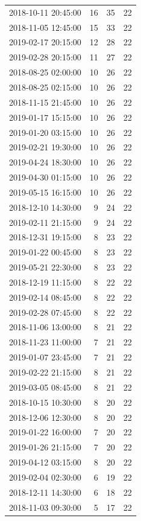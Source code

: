 \begin{tabular}{lrrr}
2018-10-11 20:45:00 & 16 & 35 & 22 \\
2018-11-05 12:45:00 & 15 & 33 & 22 \\
2019-02-17 20:15:00 & 12 & 28 & 22 \\
2019-02-28 20:15:00 & 11 & 27 & 22 \\
2018-08-25 02:00:00 & 10 & 26 & 22 \\
2018-08-25 02:15:00 & 10 & 26 & 22 \\
2018-11-15 21:45:00 & 10 & 26 & 22 \\
2019-01-17 15:15:00 & 10 & 26 & 22 \\
2019-01-20 03:15:00 & 10 & 26 & 22 \\
2019-02-21 19:30:00 & 10 & 26 & 22 \\
2019-04-24 18:30:00 & 10 & 26 & 22 \\
2019-04-30 01:15:00 & 10 & 26 & 22 \\
2019-05-15 16:15:00 & 10 & 26 & 22 \\
2018-12-10 14:30:00 & 9 & 24 & 22 \\
2019-02-11 21:15:00 & 9 & 24 & 22 \\
2018-12-31 19:15:00 & 8 & 23 & 22 \\
2019-01-22 00:45:00 & 8 & 23 & 22 \\
2019-05-21 22:30:00 & 8 & 23 & 22 \\
2018-12-19 11:15:00 & 8 & 22 & 22 \\
2019-02-14 08:45:00 & 8 & 22 & 22 \\
2019-02-28 07:45:00 & 8 & 22 & 22 \\
2018-11-06 13:00:00 & 8 & 21 & 22 \\
2018-11-23 11:00:00 & 7 & 21 & 22 \\
2019-01-07 23:45:00 & 7 & 21 & 22 \\
2019-02-22 21:15:00 & 8 & 21 & 22 \\
2019-03-05 08:45:00 & 8 & 21 & 22 \\
2018-10-15 10:30:00 & 8 & 20 & 22 \\
2018-12-06 12:30:00 & 8 & 20 & 22 \\
2019-01-22 16:00:00 & 7 & 20 & 22 \\
2019-01-26 21:15:00 & 7 & 20 & 22 \\
2019-04-12 03:15:00 & 8 & 20 & 22 \\
2019-02-04 02:30:00 & 6 & 19 & 22 \\
2018-12-11 14:30:00 & 6 & 18 & 22 \\
2018-11-03 09:30:00 & 5 & 17 & 22 \\

\end{tabular}
